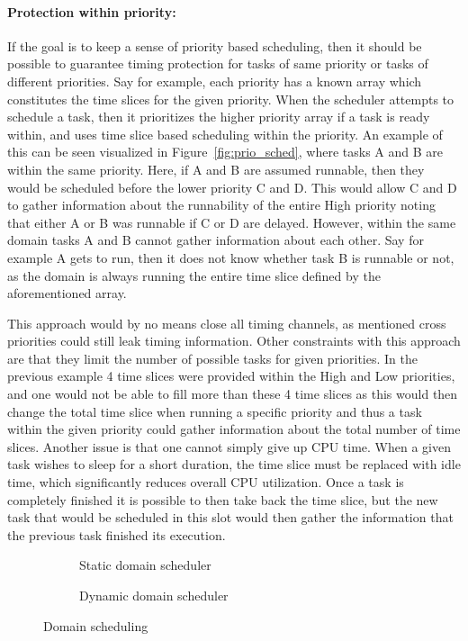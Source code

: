 \paragraph{Protection within priority:} If the goal is to keep a sense of
priority based scheduling, then it should be possible to guarantee timing
protection for tasks of same priority or tasks of different priorities. Say for
example, each priority has a known array which constitutes the time slices for
the given priority. When the scheduler attempts to schedule a task, then it
prioritizes the higher priority array if a task is ready within, and uses time
slice based scheduling within the priority. An example of this can be seen
visualized in Figure~\ref{fig:prio_sched}, where tasks A and B are within the
same priority. Here, if A and B are assumed runnable, then they would be
scheduled before the lower priority C and D. This would allow C and D to gather
information about the runnability of the entire High priority noting that
either A or B was runnable if C or D are delayed. However, within the same
domain tasks A and B cannot gather information about each other. Say for
example A gets to run, then it does not know whether task B is runnable or not,
as the domain is always running the entire time slice defined by the
aforementioned array.

This approach would by no means close all timing channels, as mentioned cross
priorities could still leak timing information. Other constraints with this
approach are that they limit the number of possible tasks for given
priorities. In the previous example 4 time slices were provided within the High
and Low priorities, and one would not be able to fill more than these 4 time
slices as this would then change the total time slice when running a specific
priority and thus a task within the given priority could gather information
about the total number of time slices. Another issue is that one cannot
simply give up CPU time. When a given task wishes to sleep for a short
duration, the time slice must be replaced with idle time, which significantly
reduces overall CPU utilization. Once a task is completely finished it is
possible to then take back the time slice, but the new task that would be
scheduled in this slot would then gather the information that the previous task
finished its execution. 

\begin{figure}
  \begin{center}
    \begin{subfigure}[b]{0.45\textwidth}
      
      \caption{Static domain scheduler}
    \label{fig:static_domain_sched}
    \end{subfigure}
    \begin{subfigure}[b]{0.45\textwidth}
      
    \caption{Dynamic domain scheduler}
    \label{fig:dynamic_domain_sched}
    \end{subfigure}
  \end{center}
  \caption{Domain scheduling}
\end{figure}

